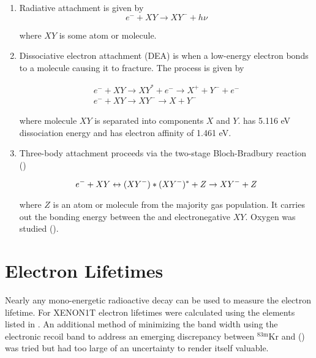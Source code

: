 \begin{enumerate}
\item Radiative attachment is given by
\begin{equation}
e^- + XY \rightarrow XY^- + h \nu
\end{equation}

\noindent where $XY$ is some atom or molecule.

\item Dissociative electron attachment (DEA) is when a low-energy electron bonds to a molecule causing it to fracture.  The process
is given by

\begin{equation}
\begin{aligned}
e^- + XY \rightarrow XY^* + e^- \rightarrow X^+ + Y^- + e^- \\
e^- + XY \rightarrow XY^- \rightarrow X + Y^-
\end{aligned}
\end{equation}

\noindent where molecule $XY$ is separated into components $X$ and $Y$.   has 5.116 eV dissociation energy and  has
electron affinity of 1.461 eV.

\item Three-body attachment proceeds via the two-stage Bloch-Bradbury reaction ()

\begin{equation}
e^- + XY \leftrightarrow (XY^-)* \\
(XY^-)^* + Z \rightarrow XY^- + Z
\end{equation}

\noindent where $Z$ is an atom or molecule from the majority gas population.  It carries out the bonding energy between the
\electron and electronegative $XY$.  Oxygen was studied ().
\end{enumerate}



\section{Electron Lifetimes}
\label{sec:electron_lifetimes}
Nearly any mono-energetic radioactive decay can be used to measure the electron lifetime.  For XENON1T electron lifetimes were calculated
using the elements listed in .  An additional method of minimizing the \stwob band width using the
 electronic recoil band to address an emerging discrepancy between
$\mathrm{^{83m}Kr}$ and \alphadecays () was tried but had too large of an uncertainty
to render itself valuable.

